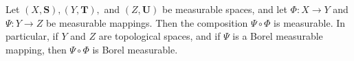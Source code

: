 Let $(X, \mathbf{S}), (Y, \mathbf{T}),$ and $(Z, \mathbf{U})$ be measurable spaces, and let $\Phi : X \to Y$ and $\Psi : Y \to Z$ be measurable mappings. Then the composition $\Psi \circ \Phi$ is measurable. In particular, if $Y$ and $Z$ are topological spaces, and if $\Psi$ is a Borel measurable mapping, then $\Psi \circ \Phi$ is Borel measurable.
